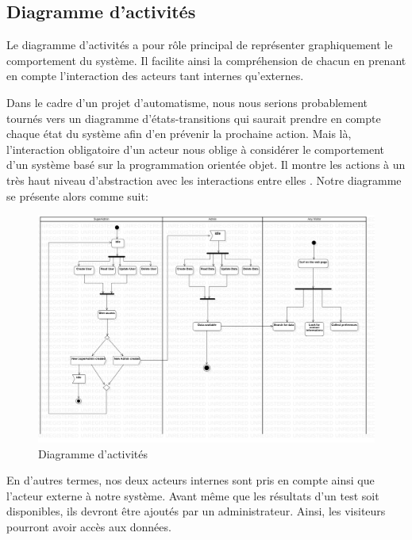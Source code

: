     \subsection{Diagramme d'activités}
    Le diagramme d'activités a pour rôle principal de représenter graphiquement 
    le comportement du système. Il facilite ainsi la compréhension de chacun en prenant 
    en compte l'interaction des acteurs tant internes qu'externes. 
    \par 
    Dans le cadre d'un projet d'automatisme, nous nous serions probablement tournés vers un 
    diagramme d'états-transitions qui saurait prendre en compte chaque état du système afin d'en prévenir
    la prochaine action. Mais là, l'interaction obligatoire d'un acteur nous oblige à 
    considérer le comportement d'un système basé sur la programmation orientée objet. Il 
    montre les actions à un très haut niveau d’abstraction avec les interactions entre elles \cite{conan2015introduction}. 
    Notre diagramme se présente alors comme suit:
    \begin{figure}[t]
        \centering
        \includegraphics[width=1\textwidth]{images/Analyse_des_besoins/ActivityDiagram.png}
        \caption{Diagramme d'activités}
        \label{fig:ActivityDiagram}
    \end{figure}
    \par 
    En d'autres termes, nos deux acteurs internes sont pris en compte ainsi que l'acteur externe 
    à notre système. Avant même que les résultats d'un test soit disponibles, ils devront être ajoutés par 
    un administrateur. Ainsi, les visiteurs pourront avoir accès aux données. 


